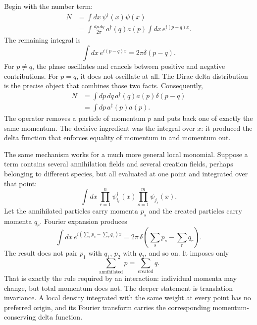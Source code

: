 Begin with the number term:
\begin{align}
N
&=\int dx\,\psi^\dagger(x)\psi(x)\\
&=\int\frac{dp\,dq}{2\pi}\,
a^\dagger(q)a(p)
\int dx\,e^{i(p-q)x}.
\end{align}
The remaining integral is
\begin{equation}
\int dx\,e^{i(p-q)x}=2\pi\delta(p-q).
\end{equation}
For \(p\ne q\), the phase oscillates and cancels between positive and negative contributions. For \(p=q\), it does not oscillate at all. The Dirac delta distribution is the precise object that combines those two facts. Consequently,
\begin{align}
N
&=\int dp\,dq\,a^\dagger(q)a(p)\delta(p-q)\\
&=\int dp\,a^\dagger(p)a(p).
\label{eq:l9-number-momentum}
\end{align}
The operator removes a particle of momentum \(p\) and puts back one of exactly the same momentum. The decisive ingredient was the integral over \(x\): it produced the delta function that enforces equality of momentum in and momentum out.

\begin{classroomqa}
\end{classroomqa}

The same mechanism works for a much more general local monomial. Suppose a term contains several annihilation fields and several creation fields, perhaps belonging to different species, but all evaluated at one point and integrated over that point:
\begin{equation}
\int dx\,
\prod_{r=1}^{n} \psi_{i_r}^\dagger(x)
\prod_{s=1}^{m} \psi_{j_s}(x).
\end{equation}
Let the annihilated particles carry momenta \(p_s\) and the created particles carry momenta \(q_r\). Fourier expansion produces
\begin{equation}
\int dx\,
e^{i(\sum_s p_s-\sum_r q_r)x}
=2\pi\,
\delta\!\left(\sum_s p_s-\sum_r q_r\right).
\label{eq:l9-total-momentum-delta}
\end{equation}
The result does not pair \(p_1\) with \(q_1\), \(p_2\) with \(q_2\), and so on. It imposes only
\begin{equation}
\sum_{\mathrm{annihilated}}p
=
\sum_{\mathrm{created}}q.
\end{equation}
That is exactly the rule required by an interaction: individual momenta may change, but total momentum does not. The deeper statement is translation invariance. A local density integrated with the same weight at every point has no preferred origin, and its Fourier transform carries the corresponding momentum-conserving delta function.

